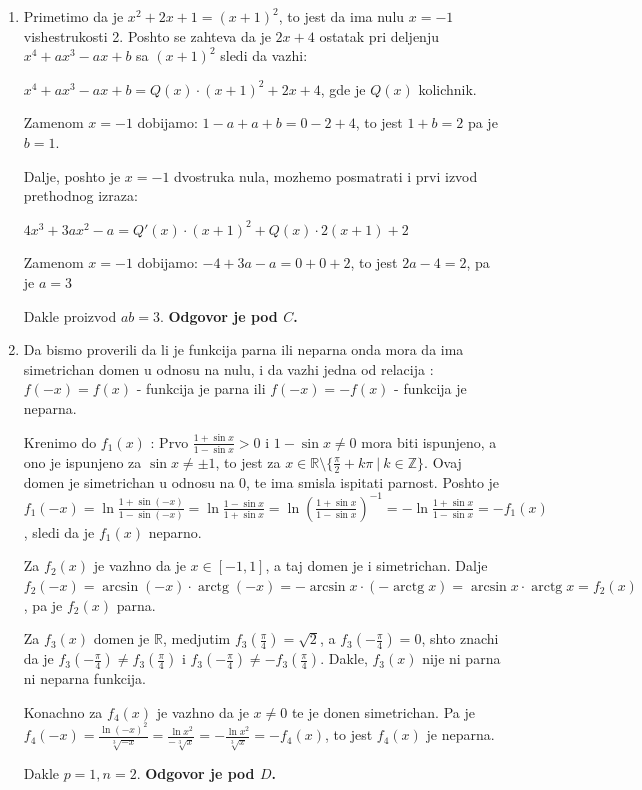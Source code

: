 \documentclass[a4paper,12pt]{article}
\renewcommand{\arctg}{\operatorname{arctg}}
\begin{document}
\begin{enumerate}[1.]
\item Primetimo da je $x^2 +2x+1 = (x+1)^2$, to jest da ima nulu $x =-1$ vishestrukosti 2. Poshto se zahteva da je $2x+4$ ostatak pri deljenju $x^4 + ax^3 -ax +b $ sa $(x+1)^2$ sledi da vazhi:
\par  $x^4 + ax^3 -ax +b  = Q(x) \cdot (x+1)^2 + 2x+4$, gde je $Q(x)$ kolichnik.
\par Zamenom $x=-1$ dobijamo: $1-a+a+b = 0 -2 +4 $, to jest $ 1+b = 2$ pa je $b = 1$.
\par Dalje, poshto je $x=-1$ dvostruka nula, mozhemo posmatrati i prvi izvod prethodnog izraza:
\par $4x^3 + 3ax^2 -a = Q'(x) \cdot (x+1)^2 + Q(x) \cdot 2(x+1) + 2$
\par Zamenom $x=-1$ dobijamo: $-4 + 3a -a = 0+0+2$, to jest $2a-4 = 2$, pa je $a = 3$
\par Dakle proizvod $ab =3 $. \textbf{Odgovor je pod $C$.}

\item Da bismo proverili da li je funkcija parna ili neparna onda mora da ima simetrichan domen u odnosu na nulu, i da vazhi jedna od relacija : $f(-x) = f(x) $ - funkcija je parna ili $f(-x) = -f(x) $ - funkcija je neparna.
\par Krenimo do $f_1(x)$ : Prvo $\frac{1 + \sin{x}}{1 - \sin{x}} > 0$ i $1 - \sin{x} \neq 0$ mora biti ispunjeno, a ono je ispunjeno za $\sin{x} \neq \pm 1$, to jest za $x \in \mathbb{R}\setminus\{\frac{\pi}{2}+k\pi\ |\ k\in\mathbb{Z}\}$. Ovaj domen je simetrichan u odnosu na 0, te ima smisla ispitati parnost. Poshto je $f_1(-x) = \ln \frac{1 + \sin(-x)}{1 - \sin(-x)} =\ln \frac{1 - \sin{x}}{1 + \sin{x}} =   \ln \left(\frac{1 + \sin{x}}{1 - \sin{x}}\right)^{-1} =-\ln\frac{1 + \sin{x}}{1 - \sin{x}}=-f_1(x) $, sledi da je $f_1(x)$ neparno.
\par Za $f_2(x)$ je vazhno da je $x \in [-1,1]$, a taj domen je i simetrichan. Dalje $ f_2(-x) = \arcsin(-x) \cdot \arctg(-x) = -  \arcsin{x} \cdot ( - \arctg{x} ) =  \arcsin{x} \cdot \arctg{x}  = f_2(x)$, pa je $f_2(x)$ parna.
\par Za $f_3(x) $ domen je $\mathbb{R}$, medjutim $f_3 \left(\frac{\pi}{4}\right) = \sqrt{2}$, a $f_3 \left(- \frac{\pi}{4}\right) = 0$, shto znachi da je $f_3 \left(-\frac{\pi}{4}\right) \neq f_3 \left(\frac{\pi}{4}\right)$ i $f_3 \left(-\frac{\pi}{4}\right)\neq-f_3 \left(\frac{\pi}{4}\right)$. Dakle, $f_3(x)$ nije ni parna ni neparna funkcija.
\par Konachno za $f_4(x)$ je vazhno da je $x\neq 0$ te je donen simetrichan. Pa je $f_4(-x) = \frac{\ln{(-x)^2}}{\sqrt[3]{-x}} = \frac{\ln{x^2}}{-\sqrt[3]{x}} = - \frac{\ln{x^2}}{\sqrt[3]{x}} = - f_4(x)$, to jest $f_4(x)$ je neparna. 
\par Dakle $p = 1,n=2$.  \textbf{Odgovor je pod $D$.}


\end{enumerate}
\end{document}
